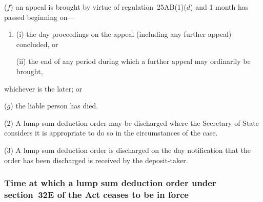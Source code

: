 \documentclass[12pt,a4paper]{article}
\begin{document}
\begin{enumerate}
($f$) an appeal is brought by virtue of regulation~25AB(1)($d$)  and 1 month has passed beginning on—
\begin{enumerate}\item[]
(i) the day proceedings on the appeal (including any further appeal) concluded, or

(ii) the end of any period during which a further appeal may ordinarily be brought,
\end{enumerate}
whichever is the later; or

($g$) the liable person has died.
\end{enumerate}

(2) A lump sum deduction order may be discharged where the 
Secretary of State  %
considers it is appropriate to do so in the circumstances of the case.

(3) A lump sum deduction order is discharged on the day notification that the order has been discharged is received by the deposit-taker.


\subsubsection[25V. Time at which a lump sum deduction order under section~32E of the Act ceases to be in force]{Time at which a lump sum deduction order under section~32E of the Act ceases to be in force}
\end{document}
